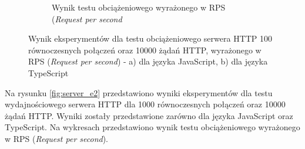 \begin{figure}[H]
\begin{subfigure}[b]{0.42\textwidth}
    \caption{Wynik testu obciążeniowego wyrażonego w RPS (\textit{Request per second}}
    \label{fig:server_e1_ts}
  \end{subfigure}
  \caption{Wynik eksperymentów dla testu obciążeniowego serwera HTTP 100 równoczesnych połączeń oraz 10000 żądań HTTP, wyrażonego w RPS (\textit{Request per second}) - a) dla języka JavaScript, b) dla języka TypeScript}
  \label{fig:server_e1}
\end{figure}

Na rysunku \ref{fig:server_e2} przedstawiono wyniki eksperymentów dla testu wydajnościowego serwera HTTP dla 1000 równoczesnych połączeń oraz 10000 żądań HTTP. Wyniki zostały przedstawione zarówno dla języka JavaScript oraz TypeScript. Na wykresach przedstawiono wynik testu obciążeniowego wyrażonego w RPS (\textit{Request per second}).

